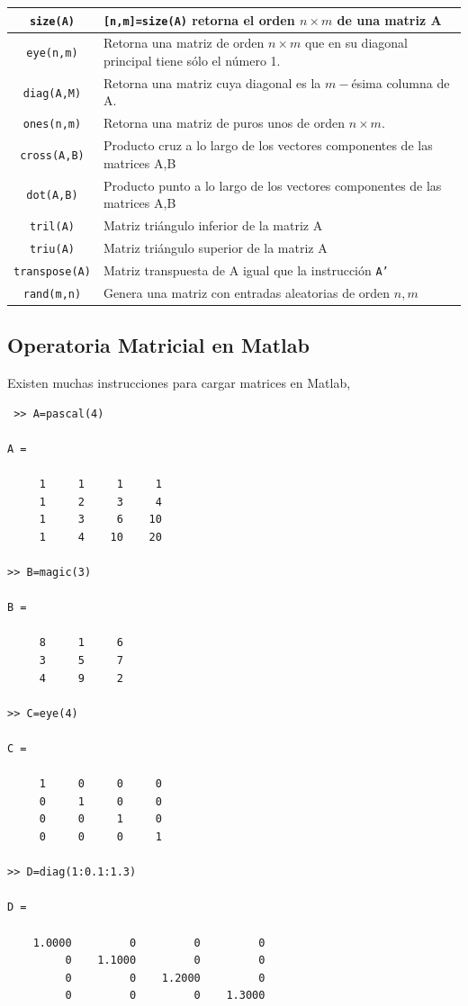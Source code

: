 \documentclass[11pt]{article}
\begin{document}
\begin{longtable}{||c|p{}||}
\hline
\texttt{size(A)}	&	\texttt{[n,m]=size(A)} retorna el orden $n\times m$  de una matriz A\\
\hline
\texttt{eye(n,m)} 	& 	Retorna una matriz de orden $n\times m$ que en su diagonal principal tiene s\'olo el n\'umero 1. \\
\hline
\texttt{diag(A,M)}	&	Retorna una matriz cuya diagonal es la $m-$\'esima columna de A.\\
\hline
\texttt{ones(n,m)}	&  	Retorna una matriz de puros unos de orden $n\times m$. \\
\hline
\texttt{cross(A,B)} & 	Producto cruz a lo largo de los vectores componentes de las matrices A,B \\
\hline
\texttt{dot(A,B)}	&	Producto punto a lo largo de los vectores componentes de las matrices A,B \\
\hline
\texttt{tril(A)}	& 	Matriz tri\'angulo inferior de la matriz A\\
\hline
\texttt{triu(A)}	& 	Matriz tri\'angulo superior de la matriz A\\
\hline
\texttt{transpose(A)} & Matriz transpuesta de A igual que la instrucci\'on \texttt{A'}\\
\hline
\texttt{rand(m,n)}	&	Genera una matriz con entradas aleatorias de orden $n,m$\\
\hline
\end{longtable}

\subsection{Operatoria Matricial en Matlab}
Existen muchas instrucciones para cargar matrices en Matlab,
\begin{multicols}{2}
\begin{verbatim}
 >> A=pascal(4)

A =

     1     1     1     1
     1     2     3     4
     1     3     6    10
     1     4    10    20 
     
>> B=magic(3)

B =

     8     1     6
     3     5     7
     4     9     2
     
>> C=eye(4)

C =

     1     0     0     0
     0     1     0     0
     0     0     1     0
     0     0     0     1
     
>> D=diag(1:0.1:1.3)

D =

    1.0000         0         0         0
         0    1.1000         0         0
         0         0    1.2000         0
         0         0         0    1.3000
     
     \end{verbatim}
\end{multicols}
\end{document}
